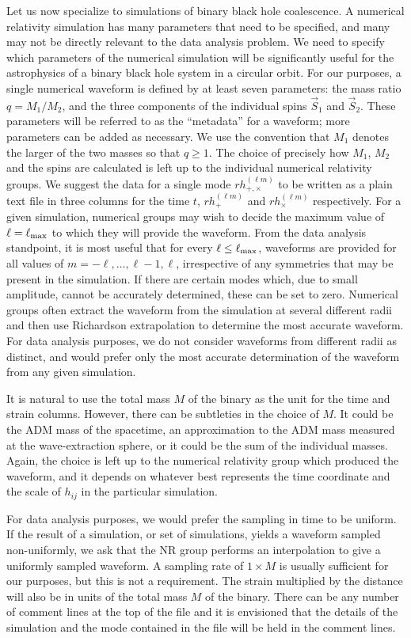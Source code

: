 \documentclass[prd,preprintnumbers,superscriptaddress,eqsecnum]{revtex4}
\numberwithin{equation}{section}
\begin{document}
{Let us now specialize to simulations of binary black hole coalescence.
A numerical relativity simulation has many parameters that need to be
specified, and many may not be directly relevant to the data
analysis problem.  We need to specify which parameters of the
numerical simulation will be significantly useful for the astrophysics
of a binary black hole system in a circular orbit.  For our purposes,
a single numerical waveform is defined by at least seven parameters:
the mass ratio $q = M_1/M_2$, and the three components of the
individual spins $\vec{S}_1$ and $\vec{S}_2$.  These parameters will
be referred to as the ``metadata'' for a waveform; more parameters can
be added as necessary. We use the convention that $M_1$ denotes the
larger of the two masses so that $q\geq 1$.  The choice of precisely
how $M_1$, $M_2$ and the spins are calculated is left up to the
individual numerical relativity groups.  We suggest the data for a
single mode $rh_{+,\times}^{(\ell m)}$ to be written as a plain text
file in three columns for the time $t$, $rh_+^{(\ell m)}$ and
$rh_\times^{(\ell m)}$ respectively.  For a given simulation,
numerical groups may wish to decide the maximum value of $\ell =
\ell_{\rm max}$ to which they will provide the waveform. From the data
analysis standpoint, it is most useful that for every $\ell \leq
\ell_{\rm max}$, waveforms are provided for all values of $m = -\ell,
\ldots, \ell - 1, \ell$, irrespective of any symmetries that may be
present in the simulation.  If there are certain modes which, due to
small amplitude, cannot be accurately determined, these can be set to
zero.  Numerical groups often extract the waveform from the simulation
at several different radii and then use Richardson extrapolation to
determine the most accurate waveform.  For data analysis purposes, we
do not consider waveforms from different radii as distinct, and would
prefer only the most accurate determination of the waveform from any
given simulation.

It is natural to use the total mass $M$ of the binary as the unit for
the time and strain columns.  However, there can be subtleties in the
choice of $M$.  It could be the ADM mass of the spacetime, an
approximation to the ADM mass measured at the wave-extraction sphere,
or it could be the sum of the individual masses.  Again, the choice is
left up to the numerical relativity group which produced the waveform,
and it depends on whatever best represents the time coordinate and the
scale of $h_{ij}$ in the particular simulation.

For data analysis purposes, we would prefer the sampling in time to be
uniform.  If the result of a simulation, or set of simulations, yields a
waveform sampled non-uniformly, we ask that the NR group performs an
interpolation to give a uniformly sampled waveform.  A sampling rate
of $1\times M$ is usually sufficient for our purposes, but this is not
a requirement.  The strain multiplied by the distance will also be in
units of the total mass $M$ of the binary.  There can be any number of
comment lines at the top of the file and it is envisioned that the
details of the simulation and the mode contained in the file will be
held in the comment lines.

}
\end{document}
